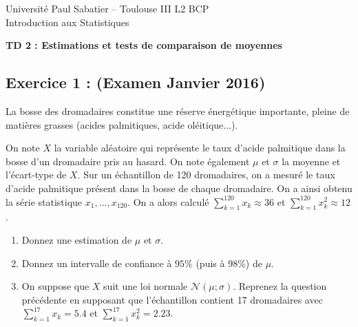 \documentclass{article}
\numberwithin{equation}{section}
\begin{document}
\noindent Université Paul Sabatier -- Toulouse III
\hfill L2 BCP\\
\noindent Introduction aux Statistiques

\bigskip
\bigskip


\begin{center}
{\bf \large TD 2 : Estimations et tests de comparaison de moyennes}\\
{\bf \large }
\end{center}

\bigskip



\subsection*{  Exercice 1 :  (Examen Janvier 2016)} 

\noindent La bosse des dromadaires constitue une  réserve énergétique importante, pleine de matières grasses (acides
palmitiques, acide oléitique...). 

\noindent On note $X$ la variable aléatoire qui représente le taux d'acide palmitique dans la bosse d'un dromadaire pris au hasard. On note également $\mu$ et $\sigma$ la moyenne et l'écart-type de $X$.
Sur un échantillon de 120 dromadaires, on a mesuré le taux d'acide palmitique présent dans la bosse de chaque
dromadaire. On a ainsi obtenu la série statistique $x_1,\hdots, x_{120}$. On a alors calculé 
$\displaystyle \sum_{k=1}^{120} x_k \approx 36$ et $\displaystyle \sum_{k=1}^{120} x_k^2 \approx 12$.
\begin{enumerate}
\item Donnez une estimation de $\mu$ et $\sigma$.
\item Donnez un intervalle de confiance à $95\%$ (puis à $98\%$) de $\mu$.
\item On suppose que $X$ suit une loi normale $\mathcal{N}(\mu ; \sigma)$. Reprenez la question précédente en supposant que l'échantillon contient 17 dromadaires avec $\displaystyle \sum_{k=1}^{17} x_k=5.4$  et $\displaystyle \sum_{k=1}^{17} x_k^2=2.23$.
\end{enumerate}
\end{document}
